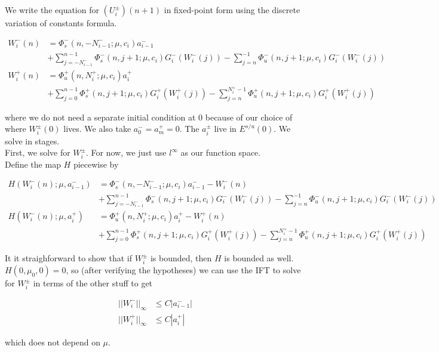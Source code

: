 \documentclass[12pt]{article}
\begin{document}
We write the equation for $(U_i^\pm)(n+1)$ in fixed-point form using the discrete variation of constants formula.

\begin{align*}
W_i^-(n) &= 
\Phi_s^-(n, -N_{i-1}^-; \mu, c_i) a_{i-1}^- \\
&+ \sum_{j = -N_{i-1}^-}^{n-1} \Phi_s^-(n, j+1; \mu, c_i) G_i^-(W_i^-(j)) - \sum_{j = n}^{-1} \Phi_u^-(n, j+1; \mu, c_i) G_i^-(W_i^-(j)) \\
W_i^+(n) &= \Phi_u^+(n, N_i^+; \mu, c_i) a_i^+ \\
&+ \sum_{j = 0}^{n-1} \Phi_s^+(n, j+1; \mu, c_i) G_i^+(W_i^+(j)) 
- \sum_{j = n}^{N_i^+-1} \Phi_u^+(n, j+1; \mu, c_i) G_i^+(W_i^+(j))
\end{align*}

where we do not need a separate initial condition at 0 because of our choice of where $W_i^\pm(0)$ lives. We also take $a_0^- = a_m^+ = 0$. The $a_i^\pm$ live in $E^{s/u}(0)$. We solve in stages.\\

First, we solve for $W_i^\pm$. For now, we just use $l^\infty$ as our function space.\\

Define the map $H$ piecewise by

\begin{align*}
H(W_i^-(n); \mu, a_{i-1}^-) &= 
\Phi_s^-(n, -N_{i-1}^-; \mu, c_i) a_{i-1}^- - W_i^-(n) \\
&+ \sum_{j = -N_{i-1}^-}^{n-1} \Phi_s^-(n, j+1; \mu, c_i) G_i^-(W_i^-(j)) - \sum_{j = n}^{-1} \Phi_u^-(n, j+1; \mu, c_i) G_i^-(W_i^-(j)) \\
H(W_i^-(n); \mu, a_i^+) &= \Phi_u^+(n, N_i^+; \mu, c_i) a_i^+ - W_i^+(n)  \\
&+ \sum_{j = 0}^{n-1} \Phi_s^+(n, j+1; \mu, c_i) G_i^+(W_i^+(j)) 
- \sum_{j = n}^{N_i^+-1} \Phi_u^+(n, j+1; \mu, c_i) G_i^+(W_i^+(j))
\end{align*}

It it straighforward to show that if $W_i^\pm$ is bounded, then $H$ is bounded as well. $H(0, \mu_0, 0) = 0$, so (after verifying the hypotheses) we can use the IFT to solve for $W_i^\pm$ in terms of the other stuff to get

\begin{align*}
||W_i^-||_\infty &\leq C |a_{i-1}^-| \\
||W_i^+||_\infty &\leq C |a_i^+|
\end{align*}

which does not depend on $\mu$.\\
\end{document}
